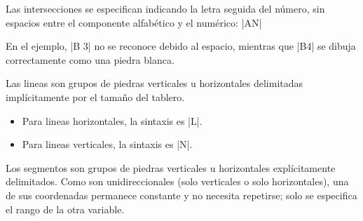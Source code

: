 \begin{goban}[9, stone = {radius = 4pt}, mark = {line = {color = red}}]

Las intersecciones se especifican indicando la letra seguida del número, sin espacios entre el componente alfabético y el numérico: |AN|

\begin{codeexample}[]
	
	\begin{goban}[label = {at = {south, west}}]
	\end{goban}
\end{codeexample}

En el ejemplo, |B 3| no se reconoce debido al espacio, mientras que |B4| se dibuja correctamente como una piedra blanca.

Las lineas son grupos de piedras verticales u horizontales delimitadas impl\'icitamente por el tama\~no del tablero.

\begin{itemize}
	\item Para lineas horizontales, la sintaxis es |L|.
	\item Para lineas verticales, la sintaxis es |N|.
\end{itemize}

\begin{codeexample}[width=6cm]
	
	\begin{goban}
	\end{goban}
	
	\begin{goban}
		\stones[b]{B2,C2,D2}
		\stones[fill = {color = blue}]{4}
	\end{goban}
	
	\begin{goban}
	\end{goban}
\end{codeexample}


Los segmentos son grupos de piedras verticales u horizontales explícitamente delimitados. Como son unidireccionales (solo verticales o solo horizontales), una de sus coordenadas permanece constante y no necesita repetirse; solo se especifica el rango de la otra variable.


\end{goban}

